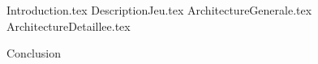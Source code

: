 \documentclass[a4paper,twoside, openany,11pt,hidelinks]{book}
\begin{document}
{Introduction.tex}
\newpage 
\pagestyle{PageNormale}
{DescriptionJeu.tex}
\newpage
{ArchitectureGenerale.tex}
\newpage
{ArchitectureDetaillee.tex}
\newpage
\pagestyle{empty}

{Conclusion}
\end{document}
